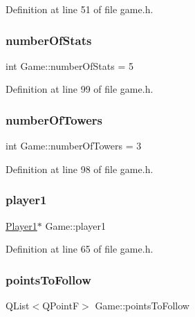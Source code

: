 Definition at line 51 of file game.\+h.

\mbox{\label{class_game_af041d097dc2350360c7951e5a41bc48a}} 
\subsubsection{\texorpdfstring{number\+Of\+Stats}{numberOfStats}}
{\footnotesize\ttfamily int Game\+::number\+Of\+Stats = 5}



Definition at line 99 of file game.\+h.

\mbox{\label{class_game_ad83fa5ba7b6421882d874704c7416033}} 
\subsubsection{\texorpdfstring{number\+Of\+Towers}{numberOfTowers}}
{\footnotesize\ttfamily int Game\+::number\+Of\+Towers = 3}



Definition at line 98 of file game.\+h.

\mbox{\label{class_game_ad8a7cc146f99c7ec5b7c3c25d73f118c}} 
\subsubsection{\texorpdfstring{player1}{player1}}
{\footnotesize\ttfamily \hyperlink{class_player1}{Player1}$\ast$ Game\+::player1}



Definition at line 65 of file game.\+h.

\mbox{\label{class_game_abe95b23433c0353887099928a5573c59}} 
\subsubsection{\texorpdfstring{points\+To\+Follow}{pointsToFollow}}
{\footnotesize\ttfamily Q\+List$<$Q\+PointF$>$ Game\+::points\+To\+Follow}




